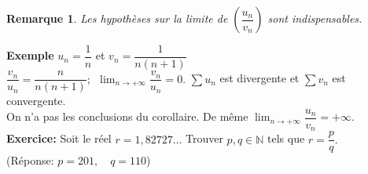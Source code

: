 \documentclass[11pt, a4paper]{book}
\newtheorem{rem}{Remarque}[section]
\begin{document}
\begin{rem} Les hypoth\`eses sur la limite de $\left(\dfrac{u_{n}}{v_{n}}\right)$ sont indispensables.\end{rem}
\textbf{Exemple}  $u_{n}=\dfrac{1}{n}$ et $v_{n}=\dfrac{1}{n(n+1)}$\\ $\dfrac{v_{n}}{u_{n}}=\dfrac{n}{n(n+1)};~~{\displaystyle \lim_{n\rightarrow+\infty} \dfrac{v_{n}}{u_{n}}=0.}$ $\sum u_{n}$ est divergente et $\sum v_{n}$ est convergente.\\ On n'a pas les conclusions du corollaire. De m\^eme ${\displaystyle\lim_{n\rightarrow+\infty} \dfrac{u_{n}}{v_{n}}=+\infty }.$\\
\textbf{Exercice:}   Soit le r\'eel $r=1,82727\ldots$ Trouver $p,q \in \mathbb{N}$ tels que $r=\dfrac{p}{q}.$\\ (R\'eponse: $p=201,\quad	q=110$)
\end{document}
